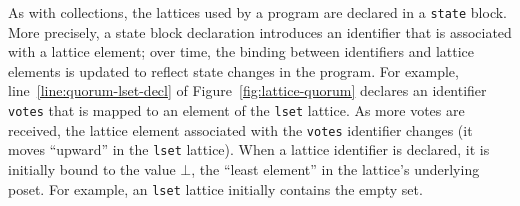 As with collections, the lattices used by a \lang program are declared in a
\texttt{state} block. More precisely, a state block declaration introduces an
identifier that is associated with a lattice element; over time, the binding
between identifiers and lattice elements is updated to reflect state changes in
the program. For example, line~\ref{line:quorum-lset-decl} of
Figure~\ref{fig:lattice-quorum} declares an identifier \texttt{votes} that is
mapped to an element of the \texttt{lset} lattice. As more votes are received,
the lattice element associated with the \texttt{votes} identifier changes (it
moves ``upward'' in the \texttt{lset} lattice). When a lattice identifier is
declared, it is initially bound to the value $\bot$, the ``least element'' in
the lattice's underlying poset. For example, an \texttt{lset} lattice initially
contains the empty set.

